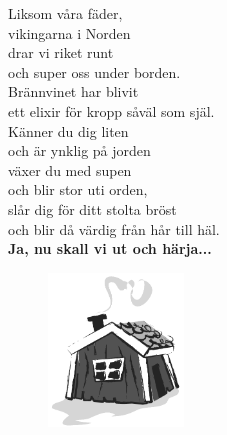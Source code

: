 \documentclass[a6paper, 10pt, twoside]{article}
\begin{document}
\begin{lyrics}
Liksom våra fäder, \\
vikingarna i Norden\\
drar vi riket runt \\och super oss under borden.\\
Brännvinet har blivit \\ett elixir för kropp såväl som själ.
\vspace{5pt}\\
Känner du dig liten \\och är ynklig på jorden\\
växer du med supen \\och blir stor uti orden,\\
slår dig för ditt stolta bröst \\och blir då värdig från hår till häl. 
\vspace{5pt}\\
\textbf{Ja, nu skall vi ut och härja...}
\end{lyrics}
\vspace{-30pt}
\begin{figure}[!h]
\includegraphics[width=0.32\textwidth]{rodstuga.png}
\end{figure}
\end{document}
